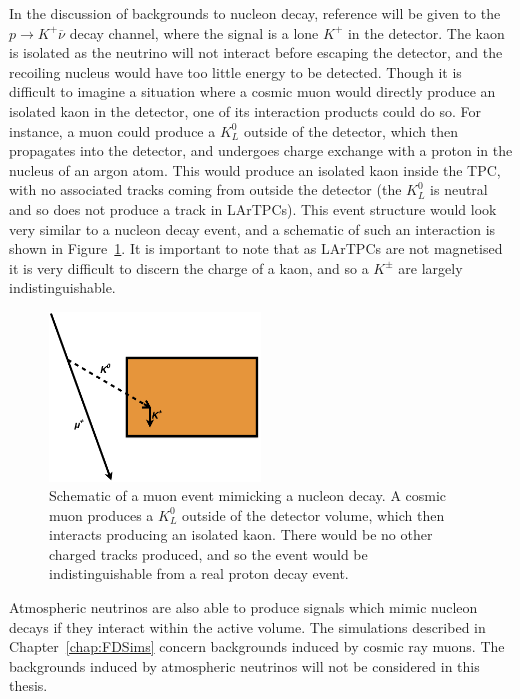 In the discussion of backgrounds to nucleon decay, reference will be given to the $p \rightarrow K^{+} \overline{\nu}$ decay channel, where the signal is a lone $K^{+}$ in the detector. The kaon is isolated as the neutrino will not interact before escaping the detector, and the recoiling nucleus would have too little energy to be detected. Though it is difficult to imagine a situation where a cosmic muon would directly produce an isolated kaon in the detector, one of its interaction products could do so. For instance, a muon could produce a $K^{0}_{L}$ outside of the detector, which then propagates into the detector, and undergoes charge exchange with a proton in the nucleus of an argon atom. This would produce an isolated kaon inside the TPC, with no associated tracks coming from outside the detector (the $K^{0}_{L}$ is neutral and so does not produce a track in LArTPCs). This event structure would look very similar to a nucleon decay event, and a schematic of such an interaction is shown in Figure~\ref{fig:K0LongBackground}. It is important to note that as LArTPCs are not magnetised it is very difficult to discern the charge of a kaon, and so a $K^{\pm}$ are largely indistinguishable. \\

\begin{figure}
  \centering
  \includegraphics[width=0.5\textwidth]{KaonNDKInteraction}
  \caption[Schematic of a muon event mimicking a nucleon decay]
          {Schematic of a muon event mimicking a nucleon decay. A cosmic muon produces a $K^{0}_{L}$ outside of the detector volume, which then interacts producing an isolated kaon. There would be no other charged tracks produced, and so the event would be indistinguishable from a real proton decay event.}
  \label{fig:K0LongBackground}
\end{figure}

Atmospheric neutrinos are also able to produce signals which mimic nucleon decays if they interact within the active volume. The simulations described in Chapter~\ref{chap:FDSims} concern backgrounds induced by cosmic ray muons. The backgrounds induced by atmospheric neutrinos will not be considered in this thesis. \\

